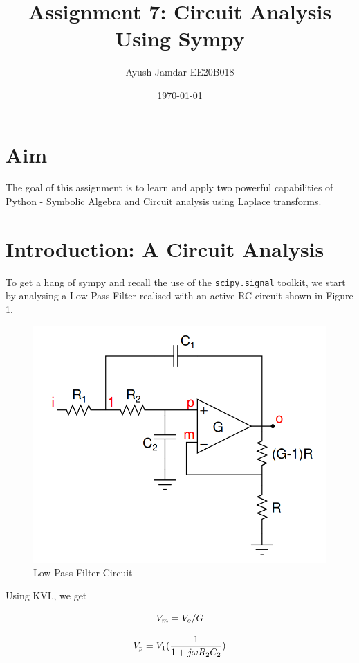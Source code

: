 \documentclass[11pt, a4paper]{article}
\title{Assignment 7: Circuit Analysis Using Sympy} %
\author{Ayush Jamdar EE20B018} %
\date{\today} %
\begin{document}
		
		
\maketitle %
\section{Aim}
The goal of this assignment is to learn and apply two powerful capabilities of Python - Symbolic Algebra and Circuit analysis using Laplace transforms.

\section{Introduction: A Circuit Analysis}
To get a hang of sympy and recall the use of the \texttt{scipy.signal} toolkit, we start by analysing a Low Pass Filter realised with an active RC circuit shown in Figure 1. 
 
  \begin{figure}[!tbh]
   	\centering
  \includegraphics[scale=0.5]{lpfckt.png} 
    \caption{Low Pass Filter Circuit} 	
   \end{figure} 
   
Using KVL,  we get

\begin{equation}
\centering
	 V_m = V_o/G  
\end{equation}

\begin{equation}
\centering
	 V_p = V_1(\frac{1}{1+j \omega R_2 C_2})  
\end{equation}
\end{document}
